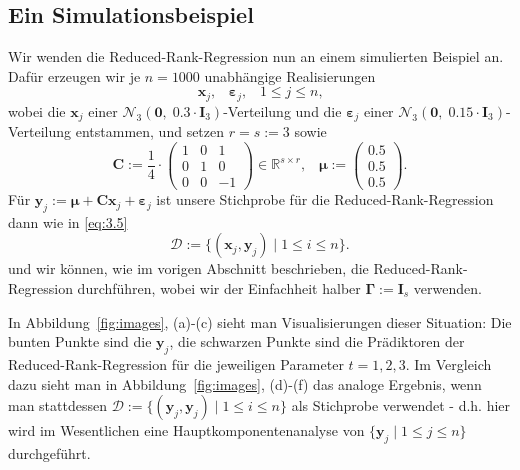 \documentclass[]{article}
\newcommand{\R}{\mathbb{R}}
\newcommand{\muu}{\bm{\mu}}
\newcommand{\C}{\mathbf{C}}
\newcommand{\Ggamma}{\mathbf{\Gamma}}
\newcommand{\xx}{\mathbf{x}}
\newcommand{\yy}{\mathbf{y}}
\begin{document}
\subsection*{Ein Simulationsbeispiel}
Wir wenden die Reduced-Rank-Regression nun an einem simulierten Beispiel an. Dafür erzeugen wir je $n=1000$ unabhängige Realisierungen 
$$\xx_j\text{,} \quad \bm{\varepsilon}_j \text{,}\quad 1 \leq j \leq n \text{,}$$
wobei die $\xx_j$ einer $\mathcal{N}_3(\mathbf{0}, \; 0.3 \cdot \mathbf{I}_3)$-Verteilung und die $\bm{\varepsilon}_j$ einer $\mathcal{N}_3(\mathbf{0}, \; 0.15 \cdot \mathbf{I}_3)$-Verteilung entstammen, und setzen $r=s:=3$ sowie
$$\C := \frac{1}{4} \cdot \begin{pmatrix}
1 & 0 & 1 \\
0 & 1 & 0 \\
0 & 0 & -1
\end{pmatrix} \in \R^{s \times r}\text{,} \quad \muu := \begin{pmatrix}
0.5 \\
0.5 \\
0.5
\end{pmatrix} \text{.}$$
Für $\yy_j := \muu + \C \xx_j + \bm{\varepsilon}_j$ ist unsere Stichprobe für die Reduced-Rank-Regression dann wie in \eqref{eq:3.5}
\[\mathcal{D} := \{(\xx_j, \yy_j) \;|\; 1 \leq i \leq n\}\text{.}\]
und wir können, wie im vorigen Abschnitt beschrieben, die Reduced-Rank-Regression durchführen, wobei wir der Einfachheit halber $\Ggamma := \mathbf{I}_s$ verwenden.

In Abbildung~\ref{fig:images}, (a)-(c) sieht man Visualisierungen dieser Situation: Die bunten Punkte sind die $\yy_j$, die schwarzen Punkte sind die Prädiktoren der Reduced-Rank-Regression für die jeweiligen Parameter $t = 1,2,3$. Im Vergleich dazu sieht man in Abbildung~\ref{fig:images}, (d)-(f) das analoge Ergebnis, wenn man stattdessen $\mathcal{D} := \{(\yy_j, \yy_j) \;|\; 1 \leq i \leq n\}$ als Stichprobe verwendet - d.h. hier wird im Wesentlichen eine Hauptkomponentenanalyse von $\{\yy_j \;|\; 1 \leq j \leq n\}$ durchgeführt.
\end{document}
